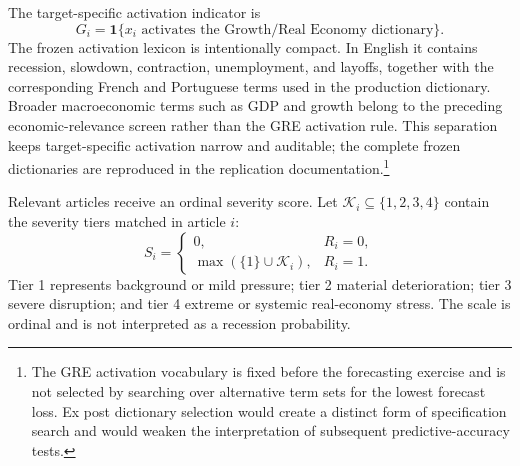 \documentclass[preprint,12pt,authoryear]{elsarticle}
\begin{document}
The target-specific activation indicator is
\begin{equation}
G_i=\mathbf{1}\{x_i\text{ activates the Growth/Real Economy dictionary}\}.
\label{eq:growthdomain}
\end{equation}
The frozen activation lexicon is intentionally compact. In English it contains recession, slowdown, contraction, unemployment, and layoffs, together with the corresponding French and Portuguese terms used in the production dictionary. Broader macroeconomic terms such as GDP and growth belong to the preceding economic-relevance screen rather than the GRE activation rule. This separation keeps target-specific activation narrow and auditable; the complete frozen dictionaries are reproduced in the replication documentation.\footnote{The GRE activation vocabulary is fixed before the forecasting exercise and is not selected by searching over alternative term sets for the lowest forecast loss. Ex post dictionary selection would create a distinct form of specification search and would weaken the interpretation of subsequent predictive-accuracy tests.}

Relevant articles receive an ordinal severity score. Let $\mathcal K_i\subseteq\{1,2,3,4\}$ contain the severity tiers matched in article $i$:
\begin{equation}
S_i=\begin{cases}
0,&R_i=0,\\
\max(\{1\}\cup\mathcal K_i),&R_i=1.
\end{cases}
\label{eq:severity}
\end{equation}
Tier 1 represents background or mild pressure; tier 2 material deterioration; tier 3 severe disruption; and tier 4 extreme or systemic real-economy stress. The scale is ordinal and is not interpreted as a recession probability.
\end{document}
